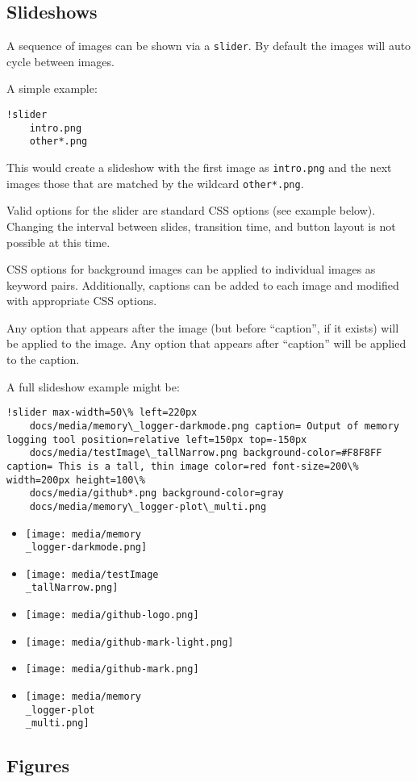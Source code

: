 \documentclass[]{report}
\begin{document}
\subsection{Slideshows\label{slideshows}}
\par
A sequence of images can be shown via a \texttt{slider}.
By default the images will auto cycle between images.
\par
A simple example:\begin{lstlisting}
!slider
    intro.png
    other*.png
\end{lstlisting}
\par
This would create a slideshow with the first image as \texttt{intro.png} and the next images those that are matched by the wildcard \texttt{other*.png}.
\par
Valid options for the slider are standard CSS options (see example below).  Changing
the interval between slides, transition time, and button layout is not possible
at this time.
\par
CSS options for background images can be applied to individual images as keyword
pairs.  Additionally, captions can be added to each image and
modified with appropriate CSS options.
\par
Any option that appears after the image (but before ``caption'', if it exists)
will be applied to the image.  Any option that
appears after ``caption'' will be applied to the caption.
\par
A full slideshow example might be:\begin{lstlisting}
!slider max-width=50\% left=220px
    docs/media/memory\_logger-darkmode.png caption= Output of memory logging tool position=relative left=150px top=-150px
    docs/media/testImage\_tallNarrow.png background-color=#F8F8FF caption= This is a tall, thin image color=red font-size=200\% width=200px height=100\%
    docs/media/github*.png background-color=gray
    docs/media/memory\_logger-plot\_multi.png
\end{lstlisting}\begin{itemize}
\item \texttt{[image: media/memory\\\_logger-darkmode.png]}

\item \texttt{[image: media/testImage\\\_tallNarrow.png]}

\item \texttt{[image: media/github-logo.png]}

\item \texttt{[image: media/github-mark-light.png]}

\item \texttt{[image: media/github-mark.png]}

\item \texttt{[image: media/memory\\\_logger-plot\\\_multi.png]}

\end{itemize}\subsection{Figures\label{figures}}
\end{document}
